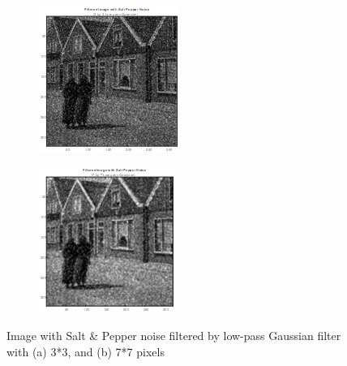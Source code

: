 \begin{figure} [ht]
    \centering
    \begin{subfigure}{0.4\textwidth}
        \includegraphics[width=\textwidth]{Resources/F7-a.png}
        \caption{}
        \label{fig:first}
    \end{subfigure}
    \hfill
    \begin{subfigure}{0.4\textwidth}
        \includegraphics[width=\textwidth]{Resources/F7-b.png}
        \caption{}
        \label{fig:Second}
    \end{subfigure}
    \caption{Image with Salt \& Pepper noise filtered by low-pass Gaussian filter with (a) 3*3, and (b) 7*7 pixels}
    \label{fig:ApplyingFilters}
\end{figure}


